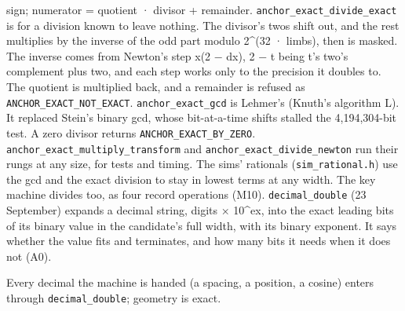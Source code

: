 \begin{description}
sign; numerator = quotient · divisor + remainder. \texttt{anchor\_\allowbreak{}exact\_\allowbreak{}divide\_\allowbreak{}exact} is for a division known to leave nothing. The divisor's twos shift out, and the rest multiplies by the inverse of the odd part modulo 2\textasciicircum{}(32 · limbs), then is masked. The inverse comes from Newton's step x(2 − dx), 2 − t being t's two's complement plus two, and each step works only to the precision it doubles to. The quotient is multiplied back, and a remainder is refused as \texttt{ANCHOR\_\allowbreak{}EXACT\_\allowbreak{}NOT\_\allowbreak{}EXACT}. \texttt{anchor\_\allowbreak{}exact\_\allowbreak{}gcd} is Lehmer's (Knuth's algorithm L). It replaced Stein's binary gcd, whose bit-at-a-time shifts stalled the 4,194,304-bit test. A zero divisor returns \texttt{ANCHOR\_\allowbreak{}EXACT\_\allowbreak{}BY\_\allowbreak{}ZERO}. \texttt{anchor\_\allowbreak{}exact\_\allowbreak{}multiply\_\allowbreak{}transform} and \texttt{anchor\_\allowbreak{}exact\_\allowbreak{}divide\_\allowbreak{}newton} run their rungs at any size, for tests and timing. The sims' rationals (\texttt{sim\_\allowbreak{}rational.\allowbreak{}h}) use the gcd and the exact division to stay in lowest terms at any width. The key machine divides too, as four record operations (M10). \texttt{decimal\_\allowbreak{}double} (23 September) expands a decimal string, digits × 10\textasciicircum{}ex, into the exact leading bits of its binary value in the candidate's full width, with its binary exponent. It says whether the value fits and terminates, and how many bits it needs when it does not (A0).
\item[{wants}] Every decimal the machine is handed (a spacing, a position, a cosine) enters through \texttt{decimal\_\allowbreak{}double}; geometry is exact.

\end{description}
